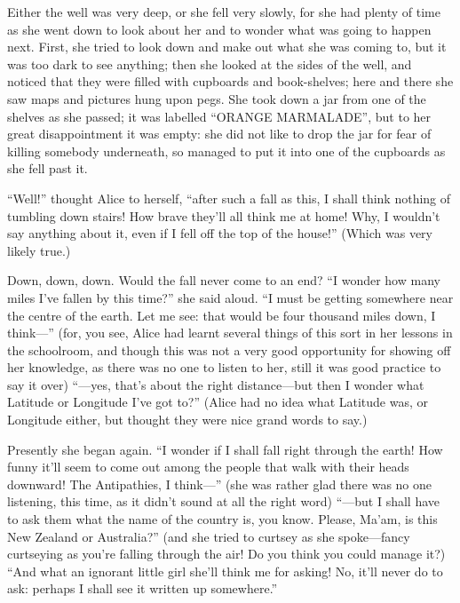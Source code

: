 \documentclass{bdastyle}
\begin{document}
Either the well was very deep, or she fell very slowly, for she had plenty of time as she went down to look about her and to wonder what was going to happen next. First, she tried to look down and make out what she was coming to, but it was too dark to see anything; then she looked at the sides of the well, and noticed that they were filled with cupboards and book-shelves; here and there she saw maps and pictures hung upon pegs. She took down a jar from one of the shelves as she passed; it was labelled “ORANGE MARMALADE”, but to her great disappointment it was empty: she did not like to drop the jar for fear of killing somebody underneath, so managed to put it into one of the cupboards as she fell past it.

“Well!” thought Alice to herself, “after such a fall as this, I shall think nothing of tumbling down stairs! How brave they’ll all think me at home! Why, I wouldn’t say anything about it, even if I fell off the top of the house!” (Which was very likely true.)

Down, down, down. Would the fall never come to an end? “I wonder how many miles I’ve fallen by this time?” she said aloud. “I must be getting somewhere near the centre of the earth. Let me see: that would be four thousand miles down, I think—” (for, you see, Alice had learnt several things of this sort in her lessons in the schoolroom, and though this was not a very good opportunity for showing off her knowledge, as there was no one to listen to her, still it was good practice to say it over) “—yes, that’s about the right distance—but then I wonder what Latitude or Longitude I’ve got to?” (Alice had no idea what Latitude was, or Longitude either, but thought they were nice grand words to say.)

Presently she began again. “I wonder if I shall fall right through the earth! How funny it’ll seem to come out among the people that walk with their heads downward! The Antipathies, I think—” (she was rather glad there was no one listening, this time, as it didn’t sound at all the right word) “—but I shall have to ask them what the name of the country is, you know. Please, Ma’am, is this New Zealand or Australia?” (and she tried to curtsey as she spoke—fancy curtseying as you’re falling through the air! Do you think you could manage it?) “And what an ignorant little girl she’ll think me for asking! No, it’ll never do to ask: perhaps I shall see it written up somewhere.”
\end{document}

